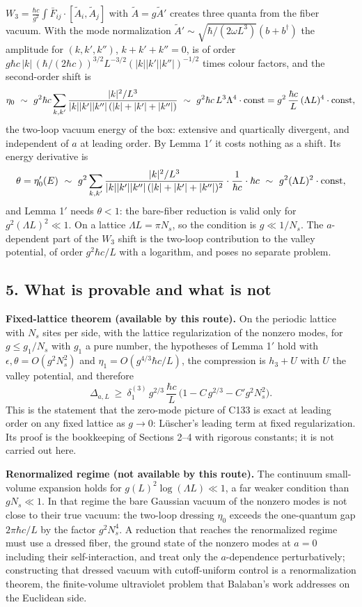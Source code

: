 \documentclass[11pt,a4paper]{article}
\begin{document}
\(W_3=\frac{\hbar c}{g^2}\int\bar F_{ij}\cdot[\tilde A_i,\tilde A_j]\)
with \(\tilde A=g\tilde A'\) creates three quanta from the fiber vacuum.
With the mode normalization
\(\tilde A'\sim\sqrt{\hbar/(2\omega L^3)}(b+b^\dagger)\) the amplitude
for \((k,k',k'')\), \(k+k'+k''=0\), is of order
\(g\hbar c\,|k|\,(\hbar/(2\hbar c))^{3/2}L^{-3/2}(|k||k'||k''|)^{-1/2}\)
times colour factors, and the second-order shift is
\[\eta_0\ \sim\ g^2\hbar c\sum_{k,k'}\frac{|k|^2/L^3}{|k||k'||k''|\,(|k|+|k'|+|k''|)}
\ \sim\ g^2\hbar c\,L^3\Lambda^4\cdot{\rm const}=g^2\,\frac{\hbar c}{L}\,(\Lambda L)^4\cdot{\rm const},\]
the two-loop vacuum energy of the box: extensive and quartically
divergent, and independent of \(a\) at leading order. By Lemma 1\('\) it
costs nothing as a shift. Its energy derivative is
\[\theta=\eta_0'(E)\ \sim\ g^2\sum_{k,k'}\frac{|k|^2/L^3}{|k||k'||k''|\,(|k|+|k'|+|k''|)^2}\cdot\frac{1}{\hbar c}\cdot\hbar c
\ \sim\ g^2(\Lambda L)^2\cdot{\rm const},\] and Lemma 1\('\) needs
\(\theta<1\): the bare-fiber reduction is valid only for
\(g^2(\Lambda L)^2\ll1\). On a lattice \(\Lambda L=\pi N_s\), so the
condition is \(g\ll1/N_s\). The \(a\)-dependent part of the \(W_3\)
shift is the two-loop contribution to the valley potential, of order
\(g^2\hbar c/L\) with a logarithm, and poses no separate problem.

\hypertarget{what-is-provable-and-what-is-not}{%
\subsection{5. What is provable and what is
not}\label{what-is-provable-and-what-is-not}}

\textbf{Fixed-lattice theorem (available by this route).} On the
periodic lattice with \(N_s\) sites per side, with the lattice
regularization of the nonzero modes, for \(g\le g_1/N_s\) with \(g_1\) a
pure number, the hypotheses of Lemma 1\('\) hold with
\(\epsilon,\theta=O(g^2N_s^2)\) and \(\eta_1=O(g^{4/3}\hbar c/L)\), the
compression is \(h_3+U\) with \(U\) the valley potential, and therefore
\[\Delta_{a,L}\ \ge\ \delta_1^{(3)}\,g^{2/3}\,\frac{\hbar c}{L}\,\big(1-C\,g^{2/3}-C'g^2N_s^2\big).\]
This is the statement that the zero-mode picture of C133 is exact at
leading order on any fixed lattice as \(g\to0\): Lüscher's leading term
at fixed regularization. Its proof is the bookkeeping of Sections 2--4
with rigorous constants; it is not carried out here.

\textbf{Renormalized regime (not available by this route).} The
continuum small-volume expansion holds for
\(g(L)^2\log(\Lambda L)\ll1\), a far weaker condition than \(gN_s\ll1\).
In that regime the bare Gaussian vacuum of the nonzero modes is not
close to their true vacuum: the two-loop dressing \(\eta_0\) exceeds the
one-quantum gap \(2\pi\hbar c/L\) by the factor \(g^2N_s^4\). A
reduction that reaches the renormalized regime must use a dressed fiber,
the ground state of the nonzero modes at \(a=0\) including their
self-interaction, and treat only the \(a\)-dependence perturbatively;
constructing that dressed vacuum with cutoff-uniform control is a
renormalization theorem, the finite-volume ultraviolet problem that
Balaban's work addresses on the Euclidean side.
\end{document}

